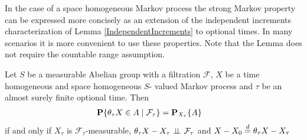 In the case of a space homogeneous Markov process the strong Markov
property can be expressed more concisely as an extension of the
independent increments characterization of Lemma
\ref{IndependentIncrements} to optional times.  In many scenarios it
is more convenient to use these properties.  Note that the Lemma does
not require the countable range assumption.
\begin{lem}\label{StrongIndependentIncrements}Let $S$ be a measurable
  Abelian group with a filtration $\mathcal{F}$, $X$ be a time
  homogeneous and space homogeneous $S$-
  valued Markov process and $\tau$ be an almost surely finite optional time.  
Then 
\begin{align*}
\cprobability{\mathcal{F}_\tau}{\theta_\tau X \in A} &= \sprobability{A}{X_\tau}
\end{align*}
if and only if $X_\tau$ is $\mathcal{F}_\tau$-measurable, $\cindependent{\theta_\tau X -
  X_\tau}{\mathcal{F}_\tau}{}$ and $X - X_0 \eqdist \theta_\tau X - X_\tau$
\end{lem}
